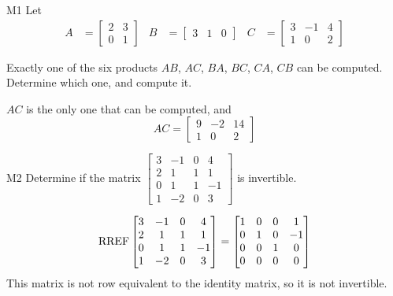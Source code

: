 \documentclass{sbgLAquiz}
\begin{document}
\begin{extract}\newpage\end{extract}
\begin{problem}{M1}
Let 
\begin{align*}
A &= \begin{bmatrix} 2 & 3 \\ 0 & 1 \end{bmatrix} & B&= \begin{bmatrix} 3 & 1 & 0 \end{bmatrix} & C&= \begin{bmatrix} 3 & -1 & 4 \\ 1 & 0 & 2 \end{bmatrix}
\end{align*}

Exactly one of the six products $AB$, $AC$, $BA$, $BC$, $CA$, $CB$ can be computed.  Determine which one, and compute it.
\end{problem}
\begin{solution}
$AC$ is the only one that can be computed, and 
$$AC = \begin{bmatrix} 9 & -2 & 14 \\ 1 & 0 & 2 \end{bmatrix}$$
\end{solution}


\begin{problem}{M2}
Determine if the matrix $\begin{bmatrix} 3 & -1 & 0 & 4 \\ 2 & 1 & 1 & 1 \\ 0 & 1 & 1 & -1 \\ 1 & -2 & 0 & 3 \end{bmatrix}$ is invertible.
\end{problem}
\begin{solution}
$$\operatorname{RREF} \begin{bmatrix} 3 & -1 & 0 & 4 \\ 2 & 1 & 1 & 1 \\ 0 & 1 & 1 & -1 \\ 1 & -2 & 0 & 3 \end{bmatrix} = \begin{bmatrix} 1 & 0 & 0 & 1 \\ 0 & 1 & 0 & -1 \\ 0 & 0 & 1 & 0 \\ 0 & 0 & 0 & 0 \end{bmatrix}$$
This matrix is not row equivalent to the identity matrix, so it is not invertible.
\end{solution}
\end{document}
